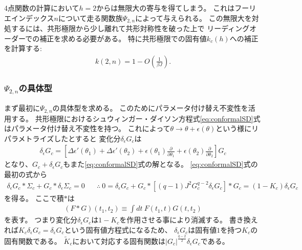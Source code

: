 4点関数の計算において$h = 2$からは無限大の寄与を得てしまう。
これはフーリエインデックス$n$について走る関数族$\Psi_{2,n}$によって与えられる。
この無限大を対処するには、共形極限から少し離れて共形対称性を破った上で
リーディングオーダーでの補正を求める必要がある。
特に共形極限での固有値$k_c(h)$への補正を計算する:
\begin{align}
	k(2, n) = 1 - O\left(\frac{1}{\beta J}\right).
\end{align}

\subsubsection{$\Psi_{2,n}$の具体型}
まず最初に$\Psi_{2,n}$の具体型を求める。
このためにパラメータ付け替え不変性を活用する。
共形極限におけるシュウィンガー・ダイソン方程式\eqref{eq:conformalSD}式はパラメータ付け替え不変性を持つ。
これによって$\theta\to\theta + \epsilon(\theta)$という様にリパラメトライズしたとすると
変化分$\delta_{\epsilon}G_c$は
\begin{align}
	\delta_{\epsilon}G_c
	= \left[\Delta\epsilon'(\theta_1) + \Delta\epsilon'(\theta_2)
		+ \epsilon(\theta_1)\frac{\partial}{\partial{\theta_1}}
		+ \epsilon(\theta_2)\frac{\partial}{\partial{\theta_2}}
	\right]G_c
	\label{eq:reparameterization_fomula}
\end{align}
となり、$G_c + \delta_{\epsilon}G_c$もまた\eqref{eq:conformalSD}式の解となる。
\eqref{eq:conformalSD}式の最初の式から
\begin{align}
	\delta_{\epsilon}G_c * \Sigma_c + G_c * \delta_{\epsilon}\Sigma_c = 0\hspace{20pt}
	\therefore\ 
	0 = \delta_{\epsilon}G_c + G_c * [(q-1)J^2G_c^{q-2}\delta_{\epsilon}G_c] * G_c
	= (1 - K_c)\delta_{\epsilon}G_c
	\label{eq:eigenfunc_of_Kc_is_reparametrization}
\end{align}
を得る。
ここで積$*$は
\begin{align}
	(F*G)(t_1, t_2) \equiv \int dt\ F(t_1, t)G(t, t_2)
\end{align}
を表す。
つまり変化分$\delta_{\epsilon}G_c$は$1 - K_c$を作用させる事により消滅する。
書き換えれば$K_c\delta_{\epsilon}G_c = \delta_{\epsilon}G_c$という固有値方程式になるため、
$\delta_{\epsilon}G_c$は固有値$1$を持つ$K_c$の固有関数である。
$\tilde{K}_c$において対応する固有関数は$|G_c|^{\frac{q-2}{2}}\delta_{\epsilon}G_c$である。

